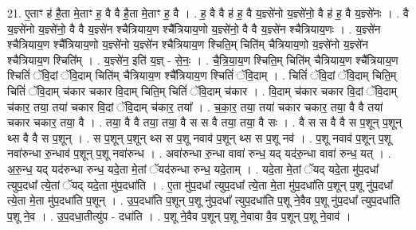 \documentclass[17pt]{extarticle}
\begin{document}
21. ए॒ताꣳ ह॑ है॒ता मे॒ताꣳ ह॒ वै वै है॒ता मे॒ताꣳ ह॒ वै । . ह॒ वै वै ह॑ ह॒ वै य॒ज्ञ्से॑नो य॒ज्ञ्से॑नो॒ वै ह॑ ह॒ वै य॒ज्ञ्से॑नः । . वै य॒ज्ञ्से॑नो य॒ज्ञ्से॑नो॒ वै वै य॒ज्ञ्से॑न श्चैत्रियाय॒ण श्चै᳚त्रियाय॒णो य॒ज्ञ्से॑नो॒ वै वै य॒ज्ञ्से॑न श्चैत्रियाय॒णः । . य॒ज्ञ्से॑न श्चैत्रियाय॒ण श्चै᳚त्रियाय॒णो य॒ज्ञ्से॑नो य॒ज्ञ्से॑न श्चैत्रियाय॒ण श्चिति॒म् चिति॑म् चैत्रियाय॒णो य॒ज्ञ्से॑नो य॒ज्ञ्से॑न श्चैत्रियाय॒ण श्चिति᳚म् । . य॒ज्ञ्से॑न॒ इति॑ य॒ज्ञ् - से॒नः॒ । . चै॒त्रि॒या॒य॒ण श्चिति॒म् चिति॑म् चैत्रियाय॒ण श्चै᳚त्रियाय॒ण श्चितिं॑ ॅवि॒दां ॅवि॒दाम् चिति॑म् चैत्रियाय॒ण श्चै᳚त्रियाय॒ण श्चितिं॑ ॅवि॒दाम् । . चितिं॑ ॅवि॒दां ॅवि॒दाम् चिति॒म् चितिं॑ ॅवि॒दाम् च॑कार चकार वि॒दाम् चिति॒म् चितिं॑ ॅवि॒दाम् च॑कार । . वि॒दाम् च॑कार चकार वि॒दां ॅवि॒दाम् च॑कार॒ तया॒ तया॑ चकार वि॒दां ॅवि॒दाम् च॑कार॒ तया᳚ । . च॒का॒र॒ तया॒ तया॑ चकार चकार॒ तया॒ वै वै तया॑ चकार चकार॒ तया॒ वै । . तया॒ वै वै तया॒ तया॒ वै स स वै तया॒ तया॒ वै सः । . वै स स वै वै स प॒शून् प॒शून् थ्स वै वै स प॒शून् । . स प॒शून् प॒शून् थ्स स प॒शू नवाव॑ प॒शून् थ्स स प॒शू नव॑ । . प॒शू नवाव॑ प॒शून् प॒शू नवा॑रुन्धा रु॒न्धाव॑ प॒शून् प॒शू नवा॑रुन्ध । . अवा॑रुन्धा रु॒न्धा वावा॑ रुन्ध॒ यद् यद॑रु॒न्धा वावा॑ रुन्ध॒ यत् । . अ॒रु॒न्ध॒ यद् यद॑रुन्धा रुन्ध॒ यदे॒ता मे॒तां ॅयद॑रुन्धा रुन्ध॒ यदे॒ताम् । . यदे॒ता मे॒तां ॅयद् यदे॒ता मु॑प॒दधा᳚ त्युप॒दधा᳚ त्ये॒तां ॅयद् यदे॒ता मु॑प॒दधा॑ति । . ए॒ता मु॑प॒दधा᳚ त्युप॒दधा᳚ त्ये॒ता मे॒ता मु॑प॒दधा॑ति प॒शून् प॒शू नु॑प॒दधा᳚ त्ये॒ता मे॒ता मु॑प॒दधा॑ति प॒शून् । . उ॒प॒दधा॑ति प॒शून् प॒शू नु॑प॒दधा᳚ त्युप॒दधा॑ति प॒शू ने॒वैव प॒शू नु॑प॒दधा᳚ त्युप॒दधा॑ति प॒शू ने॒व । . उ॒प॒दधा॒तीत्यु॑प - दधा॑ति । . प॒शू ने॒वैव प॒शून् प॒शू ने॒वावा वै॒व प॒शून् प॒शू ने॒वाव॑ । \newline
\end{document}
